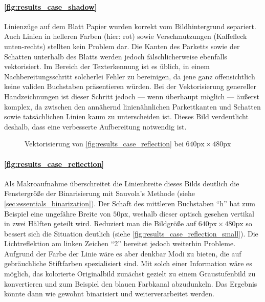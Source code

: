 \paragraph{\autoref{fig:results_case_shadow}}
Linienzüge auf dem Blatt Papier wurden korrekt vom Bildhintergrund separiert.
Auch Linien in helleren Farben (hier: rot) sowie Verschmutzungen (Kaffefleck unten-rechts) stellten kein Problem dar.
Die Kanten des Parketts sowie der Schatten unterhalb des Blatts werden jedoch fälschlicherweise ebenfalls vektorisiert.
Im Bereich der Texterkennung ist es üblich, in einem Nachbereitungsschritt solcherlei Fehler zu bereinigen, da jene ganz offensichtlich keine validen Buchstaben präsentieren würden.
Bei der Vektorisierung genereller Handzeichnungen ist dieser Schritt jedoch --- wenn überhaupt möglich --- äußerst komplex, da zwischen den annähernd linienähnlichen Parkettkanten und Schatten sowie tatsächlichen Linien kaum zu unterscheiden ist.
Dieses Bild verdeutlicht deshalb, dass eine verbesserte Aufbereitung notwendig ist.

\wrapfigurefix{0bp}
\begin{wrapfigure}{R}{5cm}
    \centering
    
    \caption{Vektorisierung von \autoref{fig:results_case_reflection} bei \(640\text{px}\times480\text{px}\)}%
    \label{fig:results_case_reflection_small}
\end{wrapfigure}
\paragraph{\autoref{fig:results_case_reflection}}
Als Makroaufnahme überschreitet die Linienbreite dieses Bilds deutlich die Fenstergröße der Binarisierung mit Sauvola's Methode (siehe \autoref{sec:essentials_binarization}).
Der Schaft des mittleren Buchstaben \enquote{h} hat zum Beispiel eine ungefähre Breite von \(50\text{px}\), weshalb dieser optisch gesehen vertikal in zwei Hälften geteilt wird.
Reduziert man die Bildgröße auf \(640\text{px}\times480\text{px}\) so bessert sich die Situation deutlich (siehe \autoref{fig:results_case_reflection_small}).
Die Lichtreflektion am linken Zeichen \enquote{2} bereitet jedoch weiterhin Probleme.
Aufgrund der Farbe der Linie wäre es aber denkbar Modi zu bieten, die auf gebräuchliche Stiftfarben spezialisiert sind.
Mit solch einer Information wäre es möglich, das kolorierte Originalbild zunächst gezielt zu einem Graustufenbild zu konvertieren und zum Beispiel den blauen Farbkanal abzudunkeln.
Das Ergebnis könnte dann wie gewohnt binarisiert und weiterverarbeitet werden.
\wrapfigureunfix{}


